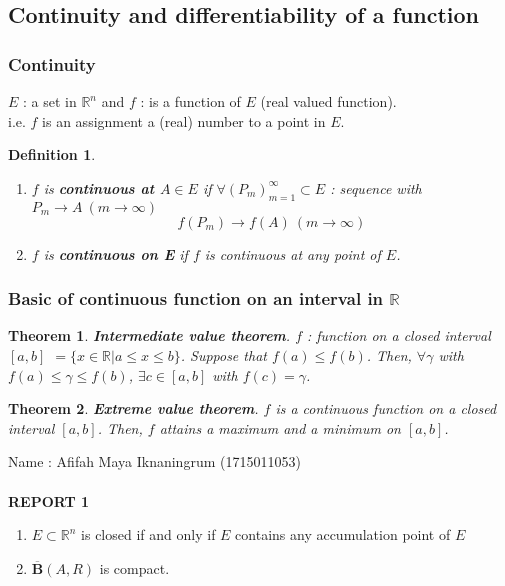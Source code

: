 \documentclass[a4paper,10pt]{article}
\newtheorem{theo}{Theorem}
\newtheorem{defi}{Definition}
\newcommand{\R}{\mathbb{R}}
\begin{document}
\subsection{Continuity and differentiability of a function}

\subsubsection{Continuity}
$ E $ : a set in $ \R^n $ and $ f $ : is a function of $ E $ (real valued function).\\
 i.e. $ f $ is an assignment a (real) number to a point in $ E $. %

\begin{defi}
	\begin{enumerate}
		\item $ f $ is \textbf{continuous at $ A \in E $} if $ \forall (P_{m})_{m=1}^{\infty} \subset E $ : sequence with $ P_{m} \rightarrow A \ (m \rightarrow \infty) $
		\[ f(P_{m}) \rightarrow f(A) \ (m \rightarrow \infty) \]
		\item $ f $ is \textbf{continuous on E} if $ f $ is continuous at any point of $ E $.
	\end{enumerate}
\end{defi}

\subsubsection{Basic of continuous function on an interval in $ \R $}

\begin{theo}
	\textbf{Intermediate value theorem}. $ f $ : function on a closed interval $ [a,b] $ $ = \{ x \in \R | a \leq x \leq b \} $. Suppose that $ f(a) \leq f(b) $. Then, $ \forall \gamma $ with $ f(a) \leq \gamma \leq f(b) $, $ \exists c \in [a,b] $ with $ f(c)=\gamma $.
\end{theo}

\begin{theo}
	\textbf{Extreme value theorem}. $ f $ is a continuous function on a closed interval $ [a,b] $. Then, $ f $ attains a maximum and a minimum on $ [a,b] $.
\end{theo}

\newpage
 Name	: Afifah Maya Iknaningrum  (1715011053)\\ \\
 \hspace{2cm}
\textbf{REPORT 1}

\begin{enumerate}
	\item $ E \subset \R^n $ is closed if and only if $ E $ contains any accumulation point of $ E $
	\item $ \overline{\mathbf{B}}(A,R) $ is compact.
\end{enumerate}
\end{document}

